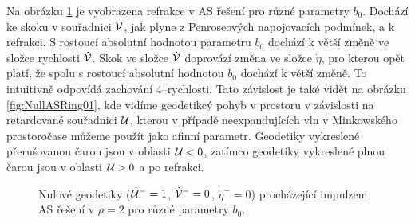 Na obrázku \ref{fig:Null_UV_AichelburgSexl_parameters} je vyobrazena refrakce v AS řešení pro různé
parametry $b_0$. Dochází ke skoku v souřadnici $\mathcal{V}$, jak plyne z Penroseových napojovacích podmínek, a k refrakci.
S rostoucí absolutní hodnotou parametru $b_0$ dochází k větší změně ve složce rychlosti $\dot {\mathcal{V}}$.
Skok ve složce $\dot {\mathcal{V}}$ doprovází změna ve složce $\dot \eta$, pro kterou opět platí, že spolu s
rostoucí absolutní hodnotou $b_0$ dochází k větší změně. To intuitivně odpovídá zachování 4--rychlosti.
Tato závislost je také vidět na obrázku \ref{fig:NullASRing01},
kde vidíme geodetikcý pohyb v prostoru v závislosti na retardované souřadnici $\mathcal{U}$, kterou v případě neexpandujících vln
v Minkowského prostoročase můžeme použít jako afinní parametr. Geodetiky vykreslené přerušovanou čarou jsou v oblasti $\mathcal{U} < 0$,
zatímco geodetiky vykreslené plnou čarou jsou v oblasti $\mathcal{U} > 0$ a po refrakci.

\begin{figure}[ht]
    \centering
     \caption{Nulové geodetiky ($\dot {\mathcal{U}}^-=1$, $\dot {\mathcal{V}}^-=0$, $\dot \eta^-=0$) procházející impulzem
     AS řešení v $\rho=2$ pro různé parametry $b_0$.}
     \label{fig:Null_UV_AichelburgSexl_parameters}
\end{figure}

